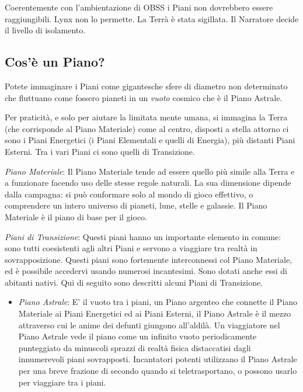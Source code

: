 \documentclass[a4paper,twoside,openany]{book}
\begin{document}
\begin{changemargin}{0.3cm}{0.3cm}\begin{narratore} %
		Coerentemente con l'ambientazione di OBSS i Piani non dovrebbero essere raggiungibili. Lynx non lo permette. La Terrà è stata sigillata. Il Narratore decide il livello di isolamento.
\end{narratore}\end{changemargin}

\begin{multicols}{2}

\subsection{Cos'è un Piano?}

Potete immaginare i Piani come gigantesche sfere di diametro non determinato che fluttuano come fossero pianeti in un \emph{vuoto} cosmico che è il Piano Astrale.

Per praticità, e solo per aiutare la limitata mente umana, si immagina la Terra (che corrisponde al Piano Materiale) come al centro, disposti a stella attorno ci sono i Piani Energetici (i Piani Elementali e quelli di Energia), più distanti Piani Esterni. Tra i vari Piani ci sono quelli di Transizione.

\emph{Piano Materiale}: Il Piano Materiale tende ad essere quello più simile alla Terra e a funzionare facendo uso delle stesse regole naturali. La sua dimensione dipende dalla campagna: si può conformare solo al mondo di gioco effettivo, o comprendere un intero universo di pianeti, lune, stelle e galassie. Il Piano Materiale è il piano di base per il gioco.

\emph{Piani di Transizione}: Questi piani hanno un importante elemento in comune: sono tutti coesistenti agli altri Piani e servono a viaggiare tra realtà in sovrapposizione. Questi piani sono fortemente interconnessi col Piano Materiale, ed è possibile accedervi usando numerosi incantesimi. Sono dotati anche essi di abitanti nativi. Qui di seguito sono descritti alcuni Piani di Transizione.

\begin{itemize}[leftmargin=*] \setlength{\itemsep}{0pt}
	\item
	\emph{Piano Astrale}: E' il vuoto tra i piani, un Piano argenteo che connette il Piano Materiale ai Piani Energetici ed ai Piani Esterni, il Piano Astrale è il mezzo attraverso cui le anime dei defunti giungono all'aldilà. Un viaggiatore nel Piano Astrale vede il piano come un infinito vuoto periodicamente punteggiato da minuscoli sprazzi di realtà fisica distaccatisi dagli innumerevoli piani sovrapposti. Incantatori potenti utilizzano il Piano Astrale per una breve frazione di secondo quando si teletrasportano, o possono usarlo per viaggiare tra i piani.
	

\end{itemize}
\end{multicols}
\end{document}
